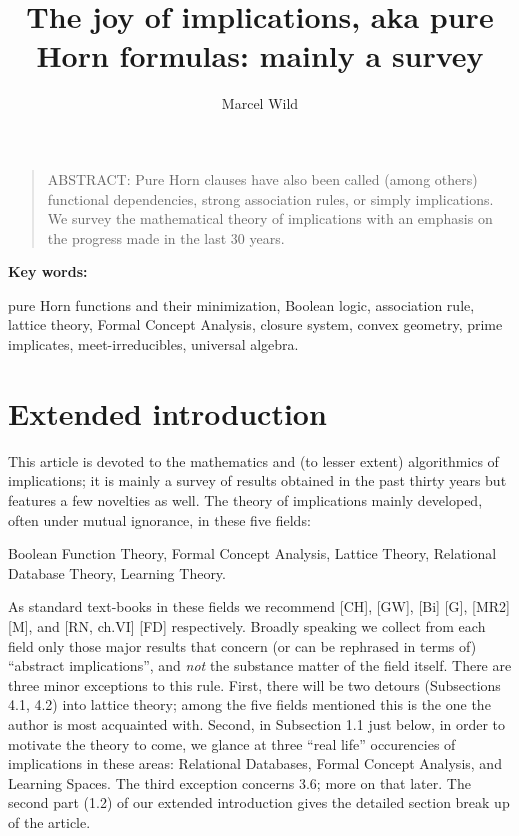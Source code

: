 \documentclass[11pt]{article}
\begin{document}
\title{The joy of implications, aka pure Horn formulas: mainly a survey}

\author{Marcel Wild}

\date{}
\maketitle


\begin{quote}
A{\scriptsize BSTRACT}: Pure Horn clauses have also been called (among others) functional dependencies, strong association rules, or simply implications. We survey the mathematical theory of implications with an emphasis on the progress made in the last 30 years.
\end{quote}

{\bf Key words:}

pure Horn functions and their minimization, Boolean logic, association rule, lattice theory, Formal Concept Analysis, closure system, convex geometry, prime implicates, meet-irreducibles, universal algebra.


\section{Extended introduction}

This article is devoted to the mathematics and (to lesser extent) algorithmics of implications; it is mainly a survey of results obtained in the past thirty years but features a few novelties as well. 
The theory of implications mainly developed, often under mutual ignorance, in these five fields:

 Boolean Function Theory, Formal Concept Analysis, Lattice Theory, Relational Database Theory, Learning Theory.

As standard text-books in these fields we recommend [CH], [GW], [Bi]   [G], [MR2]  [M], and [RN, ch.VI]  [FD] respectively. Broadly speaking we collect from each field only those major results that concern (or can be rephrased in terms of) ``abstract implications'', and {\it not} the substance matter of the field itself. There are three minor exceptions to this rule. First, there will be two detours (Subsections 4.1, 4.2) into lattice theory; among the five fields mentioned this is the one the author is most acquainted with. Second, in Subsection 1.1 just below, in order to motivate the theory to come, we glance at three ``real life'' occurencies of implications in these areas:
Relational Databases,
Formal Concept Analysis, and Learning Spaces. The third exception concerns 3.6; more on that later.
The second part (1.2) of our extended introduction gives the detailed section break up of the article.
\end{document}
